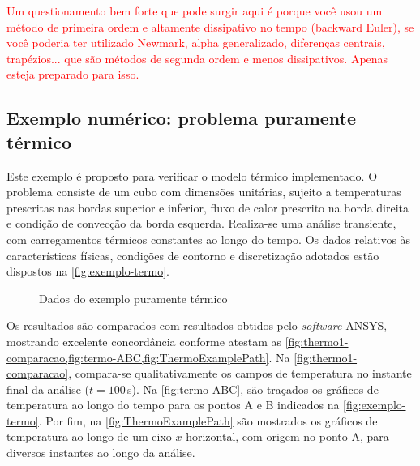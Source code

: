 \documentclass[Tese.tex]{subfiles}
\begin{document}
\textcolor{red}{Um questionamento bem forte que pode surgir aqui é porque você usou um método de primeira ordem e altamente dissipativo no tempo (backward Euler), se você poderia ter utilizado Newmark, alpha generalizado, diferenças centrais, trapézios... que são métodos de segunda ordem e menos dissipativos. Apenas esteja preparado para isso.}

\subsection{Exemplo numérico: problema puramente térmico}\label{subsec:exemplo-termo}

Este exemplo é proposto para verificar o modelo térmico implementado. O problema consiste de um cubo com dimensões unitárias, sujeito a temperaturas prescritas nas bordas superior e inferior, fluxo de calor prescrito na borda direita e condição de convecção da borda esquerda. Realiza-se uma análise transiente, com carregamentos térmicos constantes ao longo do tempo. Os dados relativos às características físicas, condições de contorno e discretização adotados estão dispostos na \autoref{fig:exemplo-termo}.

\begin{figure}[!htb]
	\centering
	\caption{Dados do exemplo puramente térmico}
	\label{fig:exemplo-termo}
	{\small
		\noindent{}
	}	
\end{figure}

Os resultados são comparados com resultados obtidos pelo \emph{software} ANSYS, mostrando excelente concordância conforme atestam as \cref{fig:thermo1-comparacao,fig:termo-ABC,fig:ThermoExamplePath}. Na \autoref{fig:thermo1-comparacao}, compara-se qualitativamente os campos de temperatura no instante final da análise ($t=100\,$s). Na \autoref{fig:termo-ABC}, são traçados os gráficos de temperatura ao longo do tempo para os pontos A e B indicados na \autoref{fig:exemplo-termo}. Por fim, na \autoref{fig:ThermoExamplePath} são mostrados os gráficos de temperatura ao longo de um eixo $x$ horizontal, com origem no ponto A, para diversos instantes ao longo da análise.
\end{document}

